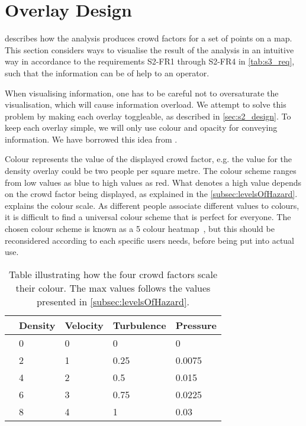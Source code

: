 \section{Overlay Design} \label{sec:s4_overlay}

 describes how the analysis produces crowd factors for a set of points on a map. This section considers ways to visualise the result of the analysis in an intuitive way in accordance to the requirements S2-FR1 through S2-FR4 in \cref{tab:s3_req}, such that the information can be of help to an operator.

When visualising information, one has to be careful not to oversaturate the visualisation, which will cause information overload. We attempt to solve this problem by making each overlay toggleable, as described in \cref{sec:s2_design}. To keep each overlay simple, we will only use colour and opacity for conveying information. We have borrowed this idea from \citet{wirz2012inferring}.

Colour represents the value of the displayed crowd factor, e.g. the value for the density overlay could be two people per square metre. The colour scheme ranges from low values as blue to high values as red. What denotes a high value depends on the crowd factor being displayed, as explained in the \cref{subsec:levelsOfHazard}.  explains the colour scale. As different people associate different values to colours, it is difficult to find a universal colour scheme that is perfect for everyone. The chosen colour scheme is known as a 5 colour heatmap~\cite{fiveheatmap}, but this should be reconsidered according to each specific users needs, before being put into actual use.

\begin{table}[htbp]
    \centering
    \begin{tabular}{l l l l l} \toprule
                        & Density & Velocity & Turbulence & Pressure \\ \midrule
    \cellcolor{low}     & 0       & 0        & 0          & 0         \\
    \cellcolor{medium}  & 2       & 1        & 0.25       & 0.0075         \\
    \cellcolor{high}    & 4       & 2        & 0.5        & 0.015         \\
    \cellcolor{higher}  & 6       & 3        & 0.75       & 0.0225         \\
    \cellcolor{highest} & 8       & 4        & 1          & 0.03         \\ \bottomrule
    \end{tabular}
    \caption[Crowd factor scale]{Table illustrating how the four crowd factors scale their colour. The max values follows the values presented in \cref{subsec:levelsOfHazard}.}
    \label{tab:color_scale}
\end{table}

